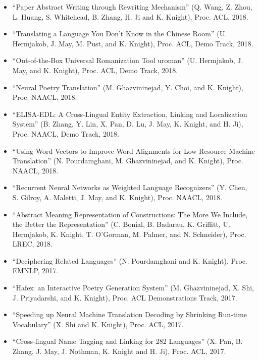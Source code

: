\begin{itemize}
\item ``Paper Abstract Writing through Rewriting Mechanism'' (Q. Wang, Z. Zhou, L. Huang, S. Whitehead, B. Zhang, H. Ji and K. Knight), Proc. ACL, 2018.

\item ``Translating a Language You Don't Know in the Chinese Room'' (U. Hermjakob, J. May, M. Pust, and K. Knight), Proc. ACL, Demo Track, 2018.

\item ``Out-of-the-Box Universal Romanization Tool uroman'' (U. Hermjakob, J. May, and K. Knight), Proc. ACL, Demo Track, 2018.

\item ``Neural Poetry Translation'' (M. Ghazvininejad, Y. Choi, and K. Knight), Proc. NAACL, 2018.

\item ``ELISA-EDL: A Cross-Lingual Entity Extraction, Linking and Localization System'' (B. Zhang, Y. Lin, X. Pan, D. Lu, J. May, K. Knight, and H. Ji), Proc. NAACL, Demo Track, 2018.

\item ``Using Word Vectors to Improve Word Alignments for Low Resource Machine Translation'' (N. Pourdamghani, M. Ghazvininejad, and K. Knight), Proc. NAACL, 2018.

\item ``Recurrent Neural Networks as Weighted Language Recognizers'' (Y. Chen, S. Gilroy, A. Maletti, J. May, and K. Knight), Proc. NAACL, 2018. 

\item ``Abstract Meaning Representation of Constructions: The More We Include, the Better the Representation'' (C. Bonial, B. Badarau, K. Griffitt, U. Hermjakob, K. Knight, T. O'Gorman, M. Palmer, and N. Schneider), Proc. LREC, 2018. 

\item ``Deciphering Related Languages'' (N. Pourdamghani and K. Knight), Proc. EMNLP, 2017. 

\item ``Hafez: an Interactive Poetry Generation System'' (M. Ghazvininejad, 
 X. Shi, J. Priyadarshi, and K. Knight), 
 Proc. ACL Demonstrations Track, 2017. 

\item ``Speeding up Neural Machine Translation Decoding by Shrinking Run-time Vocabulary'' (X. Shi and K. Knight), Proc. ACL, 2017. 

\item ``Cross-lingual Name Tagging and Linking for 282 Languages'' (X. Pan, B. Zhang, J. May, J. Nothman, K. Knight and H. Ji), Proc. ACL, 2017. 


\end{itemize}

